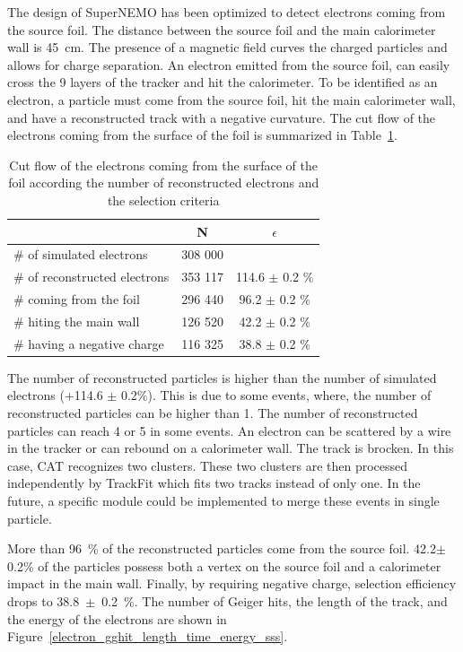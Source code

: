 \documentclass[main.tex]{subfiles}
\begin{document}
\noindent The design of SuperNEMO has been optimized to detect electrons coming from the source foil. The distance between the source foil and the main calorimeter wall is 45~cm. The presence of a magnetic field curves the charged particles and allows for charge separation. An electron emitted from the source foil, can easily cross the 9 layers of the tracker and hit the calorimeter. To be identified as an electron, a particle must come from the source foil, hit the main calorimeter wall, and have a reconstructed track with a negative curvature. The cut flow of the electrons coming from the surface of the foil is summarized in Table~\ref{Cutflowelectron}.


\begin{table}[h!]
\begin{center}
\begin{tabular}{l|c|c}
 & N & $\epsilon$ \\
\toprule
$\#$ of simulated electrons & 308 000 & \\
\hline
$\#$ of reconstructed electrons & 353 117 & 114.6 $\pm$ 0.2 \%\\
$\#$ coming from the foil       & 296 440 & 96.2  $\pm$ 0.2 \%\\
$\#$ hiting the main wall       & 126 520 & 42.2  $\pm$ 0.2 \%\\
$\#$ having a negative charge  & 116 325  & 38.8  $\pm$ 0.2 \%\\
\bottomrule
\end{tabular}
\end{center}
\caption{Cut flow of the electrons coming from the surface of the foil according the number of reconstructed electrons and the selection criteria}
\label{Cutflowelectron}
\end{table}


\noindent The number of reconstructed particles is higher than the number of simulated electrons (+114.6 $\pm$ 0.2\%). This is due to some events, where, the number of reconstructed particles can be higher than 1. The number of reconstructed particles can reach 4 or 5 in some events. An electron can be scattered by a wire in the tracker or can rebound on a calorimeter wall. The track is brocken. In this case, CAT recognizes two clusters. These two clusters are then processed independently by TrackFit which fits two tracks instead of only one. In the future, a specific module could be implemented to merge these events in single particle. 


\bigskip


\noindent More than 96~\% of the reconstructed particles come from the source foil. 42.2$\pm$0.2\% of the particles possess both a vertex on the source foil and a calorimeter impact in the main wall. Finally, by requiring negative charge, selection efficiency drops to 38.8~$\pm$~0.2~$\%$.  The number of Geiger hits, the length of the track, and the energy of the electrons are shown in Figure~\ref{electron_gghit_length_time_energy_sss}.
\end{document}
